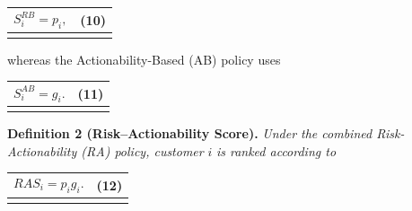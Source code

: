 \documentclass[
]{article}
\newcounter{none} %
\begin{document}
{\def\LTcaptype{none} %
\begin{longtable}[]{@{}
  >{\raggedright\arraybackslash}p{}
  >{\raggedright\arraybackslash}p{}@{}}
\toprule\noalign{}
\begin{minipage}[b]{\linewidth}\raggedright
\[S_{i}^{RB} = p_{i},\]
\end{minipage} & \begin{minipage}[b]{\linewidth}\raggedleft
(10)
\end{minipage} \\
\midrule\noalign{}
\endhead
\bottomrule\noalign{}
\endlastfoot
\end{longtable}
}

whereas the Actionability-Based (AB) policy uses

{\def\LTcaptype{none} %
\begin{longtable}[]{@{}
  >{\raggedright\arraybackslash}p{}
  >{\raggedright\arraybackslash}p{}@{}}
\toprule\noalign{}
\begin{minipage}[b]{\linewidth}\raggedright
\[S_{i}^{AB} = g_{i}.\]
\end{minipage} & \begin{minipage}[b]{\linewidth}\raggedleft
(11)
\end{minipage} \\
\midrule\noalign{}
\endhead
\bottomrule\noalign{}
\endlastfoot
\end{longtable}
}

\textbf{Definition 2 (Risk--Actionability Score).} \emph{Under the
combined Risk-Actionability (RA) policy, customer} \(i\) \emph{is ranked
according to}

{\def\LTcaptype{none} %
\begin{longtable}[]{@{}
  >{\raggedright\arraybackslash}p{}
  >{\raggedright\arraybackslash}p{}@{}}
\toprule\noalign{}
\begin{minipage}[b]{\linewidth}\raggedright
\[RAS_{i} = p_{i}g_{i}.\]
\end{minipage} & \begin{minipage}[b]{\linewidth}\raggedleft
(12)
\end{minipage} \\
\midrule\noalign{}
\endhead
\bottomrule\noalign{}
\endlastfoot
\end{longtable}
}
\end{document}
